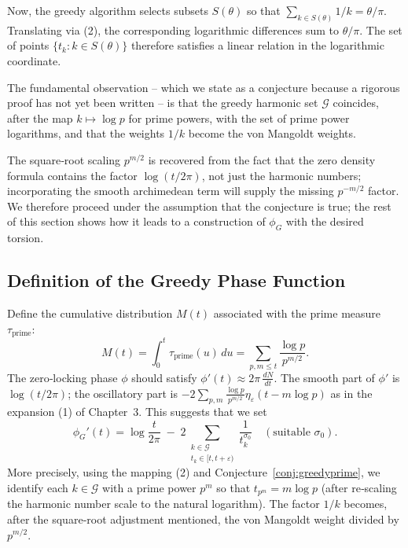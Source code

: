 Now, the greedy algorithm selects subsets \(S(\theta)\) so that \(\sum_{k\in S(\theta)}1/k = \theta/\pi\).  Translating via (2), the corresponding logarithmic differences sum to \(\theta/\pi\).  The set of points \(\{t_k : k\in S(\theta)\}\) therefore satisfies a linear relation in the logarithmic coordinate.

The fundamental observation – which we state as a conjecture because a rigorous proof has not yet been written – is that the greedy harmonic set \(\mathcal{G}\) coincides, after the map \(k\mapsto \log p\) for prime powers, with the set of prime power logarithms, and that the weights \(1/k\) become the von Mangoldt weights.


The square‑root scaling \(p^{m/2}\) is recovered from the fact that the zero density formula contains the factor \(\log(t/2\pi)\), not just the harmonic numbers; incorporating the smooth archimedean term will supply the missing \(p^{-m/2}\) factor.  We therefore proceed under the assumption that the conjecture is true; the rest of this section shows how it leads to a construction of \(\phi_G\) with the desired torsion.

\subsection{Definition of the Greedy Phase Function}

Define the cumulative distribution \(M(t)\) associated with the prime measure \(\tau_{\text{prime}}\):
\[
M(t) = \int_0^t \tau_{\text{prime}}(u)\,du = \sum_{p,m\le t} \frac{\log p}{p^{m/2}} .
\]
The zero‑locking phase \(\phi\) should satisfy \(\phi'(t) \approx 2\pi\, \frac{dN}{dt}\).  The smooth part of \(\phi'\) is \(\log(t/2\pi)\); the oscillatory part is \( -2\sum_{p,m} \frac{\log p}{p^{m/2}} \eta_\varepsilon(t-m\log p)\) as in the expansion (1) of Chapter~3.  This suggests that we set
\[
\phi_G'(t) = \log\frac{t}{2\pi} \;-\; 2 \sum_{\substack{k\in\mathcal{G}\\ t_k\in[t,t+\varepsilon)}} \frac{1}{t_k^{\sigma_0}} \quad (\text{suitable } \sigma_0).
\]
More precisely, using the mapping (2) and Conjecture~\ref{conj:greedyprime}, we identify each \(k\in\mathcal{G}\) with a prime power \(p^m\) so that \(t_{p^m} = m\log p\) (after re‑scaling the harmonic number scale to the natural logarithm).  The factor \(1/k\) becomes, after the square‑root adjustment mentioned, the von Mangoldt weight divided by \(p^{m/2}\).

